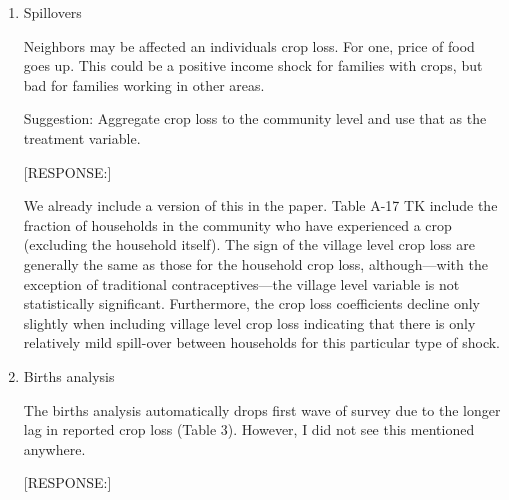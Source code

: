\documentclass[letterpaper,12pt]{article}
\begin{document}
\begin{enumerate}


\item Spillovers

Neighbors may be affected an individuals crop loss. For one, price of
food goes up. This could be a positive income shock for families with
crops, but bad for families working in other areas.

Suggestion: Aggregate crop loss to the community level and use that as
the treatment variable.


[RESPONSE:]

We already include a version of this in the paper.
Table A-17 TK include the fraction of households in the community 
who have experienced a crop (excluding the household itself).
The sign of the village level crop loss are generally the same as
those for the household crop loss, although---with the exception
of traditional contraceptives---the village level variable is not
statistically significant.
Furthermore, the crop loss coefficients decline only slightly
when including village level crop loss indicating that there is
only relatively mild spill-over between households for this
particular type of shock.


\item Births analysis

The births analysis automatically drops first wave of survey due to the
longer lag in reported crop loss (Table 3). However, I did not see this
mentioned anywhere.

[RESPONSE:]


\end{enumerate}


\newpage


\end{document}
